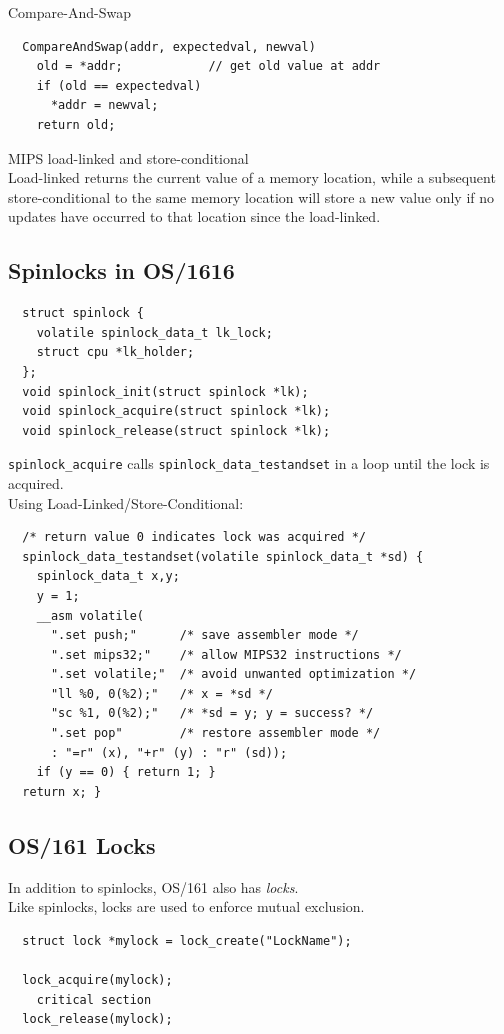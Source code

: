 \documentclass[12pt]{article}
\theoremstyle{plain}
\theoremstyle{definition}
\begin{document}
Compare-And-Swap \\
\begin{verbatim}
  CompareAndSwap(addr, expectedval, newval)
    old = *addr;            // get old value at addr
    if (old == expectedval)
      *addr = newval;
    return old;
\end{verbatim}

MIPS load-linked and store-conditional \\
Load-linked returns the current value of a memory location, while a subsequent store-conditional to the same memory location will store a new value only if no updates have occurred to that location since the load-linked.

\subsection{Spinlocks in OS/1616}
\begin{verbatim}
  struct spinlock {
    volatile spinlock_data_t lk_lock;
    struct cpu *lk_holder;
  };
  void spinlock_init(struct spinlock *lk);
  void spinlock_acquire(struct spinlock *lk);
  void spinlock_release(struct spinlock *lk);
\end{verbatim}
\texttt{spinlock\_acquire} calls \texttt{spinlock\_data\_testandset} in a loop until the lock is acquired. \\
Using Load-Linked/Store-Conditional:
\begin{verbatim}
  /* return value 0 indicates lock was acquired */
  spinlock_data_testandset(volatile spinlock_data_t *sd) {
    spinlock_data_t x,y;
    y = 1;
    __asm volatile(
      ".set push;"      /* save assembler mode */
      ".set mips32;"    /* allow MIPS32 instructions */
      ".set volatile;"  /* avoid unwanted optimization */
      "ll %0, 0(%2);"   /* x = *sd */
      "sc %1, 0(%2);"   /* *sd = y; y = success? */
      ".set pop"        /* restore assembler mode */
      : "=r" (x), "+r" (y) : "r" (sd));
    if (y == 0) { return 1; }
  return x; }
\end{verbatim}

\subsection{OS/161 Locks}
In addition to spinlocks, OS/161 also has \emph{locks}. \\
Like spinlocks, locks are used to enforce mutual exclusion.
\begin{verbatim}
  struct lock *mylock = lock_create("LockName");

  lock_acquire(mylock);
    critical section
  lock_release(mylock);
\end{verbatim}
\end{document}
